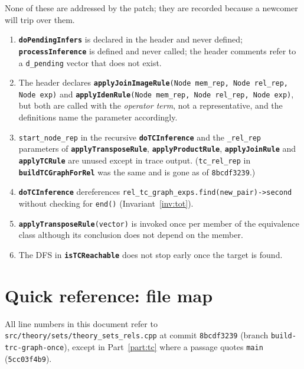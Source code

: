 \documentclass[11pt,a4paper]{article}
\newcommand{\code}[1]{\texttt{\small #1}}
\newcommand{\fn}[1]{\texttt{\small\bfseries #1}}
\newcommand{\file}[1]{\texttt{\small #1}}
\theoremstyle{definition}
\begin{document}
None of these are addressed by the patch; they are recorded because a newcomer
will trip over them.

\begin{enumerate}[leftmargin=*,itemsep=2pt]
\item \fn{doPendingInfers} is declared in the header and never defined;
  \fn{processInference} is defined and never called; the header comments refer
  to a \code{d\_pending} vector that does not exist.
\item The header declares \fn{applyJoinImageRule}\code{(Node mem\_rep, Node
  rel\_rep, Node exp)} and \fn{applyIdenRule}\code{(Node mem\_rep, Node
  rel\_rep, Node exp)}, but both are called with the \emph{operator term}, not
  a representative, and the definitions name the parameter accordingly.
\item \code{start\_node\_rep} in the recursive \fn{doTCInference} and the
  \code{*\_rel\_rep} parameters of \fn{applyTransposeRule},
  \fn{applyProductRule}, \fn{applyJoinRule} and \fn{applyTCRule} are unused
  except in trace output. (\code{tc\_rel\_rep} in \fn{buildTCGraphForRel} was
  the same and is gone as of \code{8bcdf3239}.)
\item \fn{doTCInference} dereferences
  \code{rel\_tc\_graph\_exps.find(new\_pair)->second} without checking for
  \code{end()} (Invariant~\ref{inv:tot}).
\item \fn{applyTransposeRule}\code{(vector)} is invoked once per member of the
  equivalence class although its conclusion does not depend on the member.
\item The DFS in \fn{isTCReachable} does not stop early once the target is
  found.
\end{enumerate}

\appendix
\section{Quick reference: file map}

All line numbers in this document refer to \file{src/theory/sets/theory\_sets\_rels.cpp}
at commit \code{8bcdf3239} (branch \code{build-trc-graph-once}), except in
Part~\ref{part:tc} where a passage quotes \code{main} (\code{5cc03f4b9}).
\end{document}
